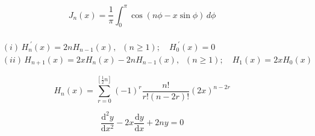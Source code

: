 \[\begin{equation} \label{thrm4.6} J_{n }(x)={\frac {1}{\pi }}\int _{0}^{\pi }\cos(n \phi -x\sin \phi )\,d\phi \end{equation}\]

\[\begin{align} \label{thrm5.6} \\\ & (i)\, H_n^{\; '}(x) = 2nH_{n-1}(x), \;\; (n \geq 1); \quad H_0^{\; '}(x) = 0 \\\ & (ii)\, H_{n+1}(x)=2xH_{n}(x)-2nH_{n-1}(x),\;\; (n\geq 1); \quad H_1(x) = 2xH_0(x) \end{align}\]

\[\begin{equation} \label{hermdef} H_{n}(x)=\sum _{r=0}^{\left[ {\frac {1}{2}n}\right ] }(-1)^r\frac{n!}{r!(n-2r)!}(2x)^{n-2r} \end{equation}\]

\[\begin{equation} \label{hermdiffeq} \frac{\mathrm{d}^2y}{\mathrm{d}x^2} - 2x\frac{\mathrm{d}y}{\mathrm{d}x} + 2ny = 0 \end{equation}\]

